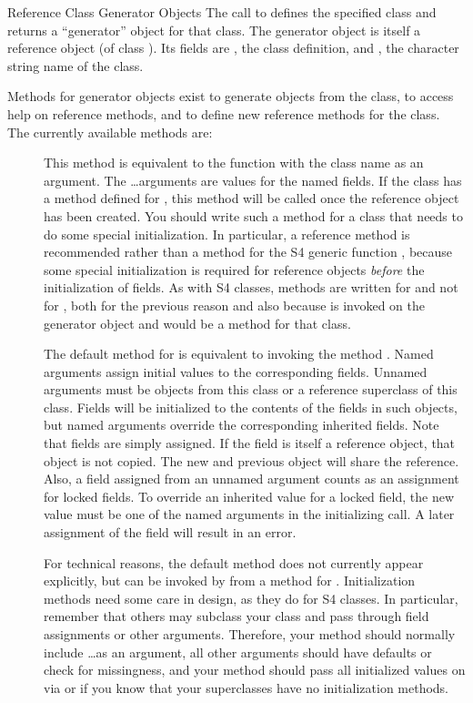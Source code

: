 %
\begin{Section}{Reference Class Generator Objects}
The call to  defines the specified class and
returns a ``generator'' object for that class.
The generator object is itself a reference object (of class
).
Its fields are , the class definition, and ,
the character string name of the class.

Methods for generator objects exist to generate objects
from the class, to access help on reference methods, and to
define new reference methods for the class.
The currently available methods are:
\begin{description}

\item[]  
This method is equivalent to the function  with the
class name as an argument.  The \dots arguments are values for the
named fields.
If the class has a method defined for , 
this method will be called once the reference object has been
created.  You should write such a method for a class that needs to do
some special initialization.
In particular, a reference method is recommended rather than a method
for the S4 generic function , because some special initialization is
required for reference objects \emph{before} the initialization of
fields.
As with S4 classes, methods are written for  
and not for , 
both for the previous reason and also because  
is invoked on the generator object and would be a method for that class.

The default method for  
is equivalent to invoking the method . 
Named arguments assign initial values to the corresponding fields.
Unnamed arguments must be objects from this class or a reference
superclass of this class.
Fields will be initialized to the contents of the fields in such
objects, but named arguments override the corresponding inherited
fields.
Note that fields are simply assigned.  If the field is itself a
reference object, that object is not copied.
The new and previous object will share the reference.
Also, a field assigned from an unnamed argument counts as an
assignment for locked fields.
To override an inherited value for a locked field, the new value must
be one of the named arguments in the initializing call.
A later assignment of the field will result in an error.

For technical reasons, the
default method does not currently appear explicitly, but can be
invoked by  
from a method for . 
Initialization methods need some care in design, as they do for S4
classes.
In particular, remember that others may subclass your class and pass
through field assignments or other arguments.  Therefore, your method
should normally include \dots as an argument, all other arguments
should have defaults or check for missingness, and your method should
pass all initialized values on via  or  if
you know that your superclasses have no initialization methods.



\end{description}
\end{Section}
